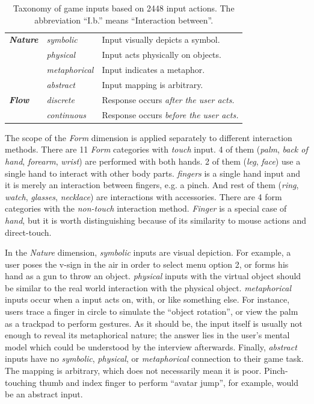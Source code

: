 \documentclass{sigchi}
\begin{document}
\begin{table}
\begin{adjustwidth}{-1cm}{}
\begin{tabular}{|l|l|l|}
        \textbf{\em{Nature}} & \em{symbolic} & Input visually depicts a symbol.\\ \cline{2-3} 
             & \em{physical} & Input acts physically on objects.\\ \cline{2-3} 
             & \em{metaphorical} & Input indicates a metaphor.\\ \cline{2-3} 
             & \em{abstract} & Input mapping is arbitrary.\\
      \Xhline{4\arrayrulewidth}
        \textbf{\em{Flow}} & \em{discrete} & Response occurs \em{after} the user acts.\\ \cline{2-3} 
             & \em{continuous} & Response occurs \em{before} the user acts.\\
      \hline
    \end{tabular}
    \caption{Taxonomy of game inputs based on 2448 input actions. The abbreviation ``I.b.'' means ``Interaction between''.}
    \label{tab:taxonomy}
    \end{adjustwidth}
  \end{table}

  The scope of the \emph{Form} dimension is applied separately to different interaction methods. There are 11 \emph{Form} categories with \emph{touch} input. 4 of them (\emph{palm}, \emph{back of hand}, \emph{forearm}, \emph{wrist}) are performed with both hands. 2 of them (\emph{leg}, \emph{face}) use a single hand to interact with other body parts. \emph{fingers} is a single hand input and it is merely an interaction between fingers, e.g. a pinch. And rest of them (\emph{ring}, \emph{watch}, \emph{glasses}, \emph{necklace}) are interactions with accessories. There are 4 form categories with the \emph{non-touch} interaction method. \emph{Finger} is a special case of \emph{hand}, but it is worth distinguishing because of its similarity to mouse actions and direct-touch.


  In the \emph{Nature} dimension, \emph{symbolic} inputs are visual depiction. For example, a user poses the v-sign in the air in order to select menu option 2, or forms his hand as a gun to throw an object. \emph{physical} inputs with the virtual object should be similar to the real world interaction with the physical object. \emph{metaphorical} inputs occur when a input acts on, with, or like something else. For instance, users trace a finger in circle to simulate the ``object rotation'', or view the palm as a trackpad to perform gestures. As it should be, the input itself is usually not enough to reveal its metaphorical nature; the answer lies in the user's mental model which could be understood by the interview afterwards. Finally, \emph{abstract} inputs have no \emph{symbolic}, \emph{physical}, or \emph{metaphorical} connection to their game task. The mapping is arbitrary, which does not necessarily mean it is poor. Pinch-touching thumb and index finger to perform ``avatar jump'', for example, would be an abstract input.
\end{document}
